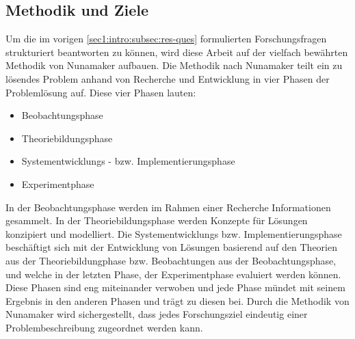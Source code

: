 \subsection{Methodik und Ziele}
\label{sec1:intro:subsec:method-goals}
Um die im vorigen \cref{sec1:intro:subsec:res-ques} formulierten Forschungsfragen strukturiert beantworten zu können, wird diese Arbeit auf der vielfach bewährten Methodik von Nunamaker \cite{nunamaker} aufbauen. Die Methodik nach Nunamaker teilt ein zu lösendes Problem anhand von Recherche und Entwicklung in vier Phasen der Problemlösung auf. Diese vier Phasen lauten:
\begin{itemize}
    \setlength{\itemsep}{0pt}
    \item Beobachtungsphase
    \item Theoriebildungsphase
    \item Systementwicklungs - bzw. Implementierungsphase
    \item Experimentphase
\end{itemize}
In der Beobachtungsphase werden im Rahmen einer Recherche Informationen gesammelt. 
In der Theoriebildungsphase werden Konzepte für Lösungen konzipiert und modelliert. 
Die Systementwicklungs bzw. Implementierungsphase beschäftigt sich mit der Entwicklung von Lösungen basierend auf den Theorien aus der Theoriebildungphase bzw. Beobachtungen aus der Beobachtungsphase, und welche in der letzten Phase, der Experimentphase evaluiert werden können. 
Diese Phasen sind eng miteinander verwoben und jede Phase mündet mit seinem Ergebnis in den anderen Phasen und trägt zu diesen bei. 
Durch die Methodik von Nunamaker wird sichergestellt, dass jedes Forschungsziel eindeutig einer Problembeschreibung zugeordnet werden kann.



